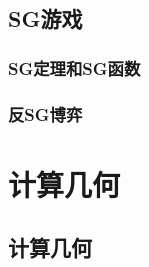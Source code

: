 \documentclass[10pt,a4paper]{article}
\begin{document}
\subsection{SG游戏}
\subsubsection{SG定理和SG函数}
\begin{spacing}{1.5}

\end{spacing}

\subsubsection{反SG博弈}
\begin{spacing}{1.5}

\end{spacing}
\section{计算几何}
\subsection{计算几何}

\end{document}
